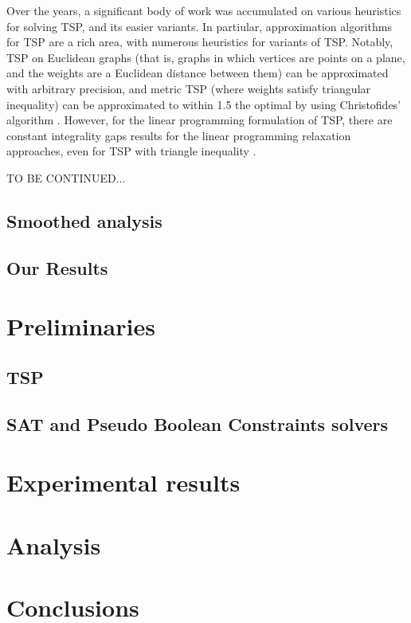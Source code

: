 \documentclass{llncs}
\begin{document}
Over the years, a significant body of work was accumulated on various heuristics for solving TSP, and its easier variants. In partiular, approximation algorithms for TSP are a rich area, with numerous heuristics for variants of TSP.  Notably, TSP on Euclidean graphs (that is, graphs in which vertices are points on a plane, and the weights are a Euclidean distance between them) can be approximated with arbitrary precision, and metric TSP (where weights satisfy triangular inequality) can be approximated to within 1.5 the optimal by using Christofides' algorithm \cite{christofides}.  However, for the linear programming formulation of TSP, there are constant integrality gaps results for the  linear programming relaxation approaches, even for TSP with triangle inequality \cite{Wat11}.    

TO BE CONTINUED... 
\subsection{Smoothed analysis} 
\subsection{Our Results} 

\section{Preliminaries} 
\subsection{TSP} 

\subsection{SAT and  Pseudo Boolean Constraints solvers} 


\section{Experimental results} 

\section{Analysis}

\section{Conclusions}




\end{document}
